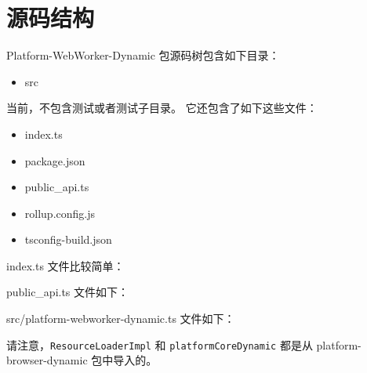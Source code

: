 \section{源码结构}


Platform-WebWorker-Dynamic 包源码树包含如下目录：

\begin{itemize}
  \item src
\end{itemize}


当前，不包含测试或者测试子目录。
它还包含了如下这些文件：

\begin{itemize}
  \item index.ts
  \item package.json
  \item public\_api.ts
  \item rollup.config.js
  \item tsconfig-build.json
\end{itemize}


index.ts 文件比较简单：




public\_api.ts 文件如下：




src/platform-webworker-dynamic.ts 文件如下：




请注意，\texttt{ResourceLoaderImpl} 和 \texttt{platformCoreDynamic} 都是从 platform-browser-dynamic 包中导入的。
